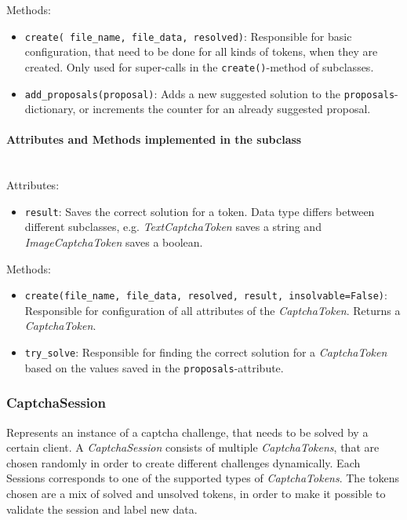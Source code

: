 Methods:

\begin{itemize}
\item \verb|create( file_name, file_data, resolved)|: Responsible for basic configuration, that need to be done for all kinds of tokens, when they are created. Only used for super-calls in the \verb|create()|-method of subclasses.
\item \verb|add_proposals(proposal)|: Adds a new suggested solution to the \verb|proposals|-dictionary, or increments the counter for an already suggested proposal.
\end{itemize}

\paragraph{Attributes and Methods implemented in the subclass} \mbox{} \\



Attributes: 


\begin{itemize}
\item \verb|result|: Saves the correct solution for a token. Data type differs between different subclasses, e.g. \emph{TextCaptchaToken} saves a string and \emph{ImageCaptchaToken} saves a boolean.
\end{itemize}


Methods:


\begin{itemize}
\item \verb|create(file_name, file_data, resolved, result, insolvable=False)|: Responsible for configuration of all attributes of the \emph{CaptchaToken}. Returns a \emph{CaptchaToken}.
\item \verb|try_solve|: Responsible for finding the correct solution for a \emph{CaptchaToken} based on the values saved in the \verb|proposals|-attribute.
\end{itemize}


\subsubsection{CaptchaSession}

Represents an instance of a captcha challenge, that needs to be solved by a certain client. A \emph{CaptchaSession} consists of multiple \emph{CaptchaTokens}, that are chosen randomly in order to create different challenges dynamically. Each Sessions corresponds to one of the supported types of \emph{CaptchaTokens}. The tokens chosen are a mix of solved and unsolved tokens, in order to make it possible to validate the session and label new data.


